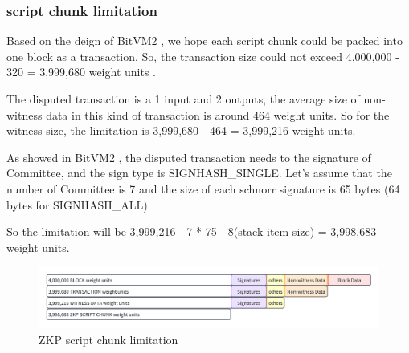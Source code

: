\subsubsection{script chunk limitation}

Based on the deign of BitVM2 \cite{website:BitVM2}, we hope each script chunk could be packed into one block as a transaction.
So, the transaction size could not exceed 4,000,000 - 320 = 3,999,680 weight units \cite{website:transaction-size}.

The disputed transaction is a 1 input and 2 outputs, the average size of non-witness data in this kind of transaction is around 464 weight units.
So for the witness size, the limitation is 3,999,680 - 464 = 3,999,216 weight units.

As showed in BitVM2 \cite{website:BitVM2}, the disputed transaction needs to the signature of Committee, and the sign type is
SIGNHASH\_SINGLE. Let's assume that the number of Committee is 7 and the size of each schnorr signature is 65 bytes (64 bytes for SIGNHASH\_ALL)

So the limitation will be 3,999,216 - 7 * 75 - 8(stack item size) = 3,998,683 weight units.

\begin{figure}[ht] 
    \centering  
    \includegraphics[width=0.85\columnwidth]{images/ZKP-script-chunk-limitation.png} 
    \caption{ZKP script chunk limitation}
    \label{fig:ZKP-script-chunk-limitation}
\end{figure}

